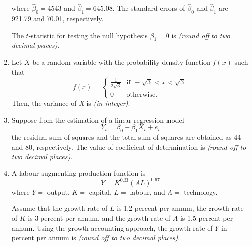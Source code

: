 \documentclass[journal,13pt,onecolumn]{exam}
\theoremstyle{remark}
\begin{document}
\begin{enumerate}[label=Q.\arabic*]
where \(\hat{\beta}_0 = 4543\) and \(\hat{\beta}_1 = 645.08\). The standard errors of \(\hat{\beta}_0\) and \(\hat{\beta}_1\) are 921.79 and 70.01, respectively.

The \(t\)-statistic for testing the null hypothesis \(\beta_1 = 0\) is \underline{\hspace{1cm}} \textit{(round off to two decimal places)}.

 \item Let \(X\) be a random variable with the probability density function \(f(x)\) such that
\[
f(x) = \begin{cases}
\frac{1}{2\sqrt{3}} & \text{if } -\sqrt{3} < x < \sqrt{3} \\
0 & \text{otherwise}.
\end{cases}
\]
Then, the variance of \(X\) is \underline{\hspace{1cm}} \textit{(in integer)}.

\item Suppose from the estimation of a linear regression model
\[
Y_i = \beta_0 + \beta_1 X_i + e_i
\]
the residual sum of squares and the total sum of squares are obtained as 44 and 80, respectively. The value of coefficient of determination is \underline{\hspace{1cm}} \textit{(round off to two decimal places)}.

\item A labour-augmenting production function is
\[
Y = K^{0.33} (AL)^{0.67}
\]
where \(Y =\) output, \(K =\) capital, \(L =\) labour, and \(A =\) technology.

Assume that the growth rate of \(L\) is 1.2 percent per annum, the growth rate of \(K\) is 3 percent per annum, and the growth rate of \(A\) is 1.5 percent per annum. Using the growth-accounting approach, the growth rate of \(Y\) in percent per annum is \underline{\hspace{1cm}} \textit{(round off to two decimal places)}.

\end{enumerate}
\end{document}
